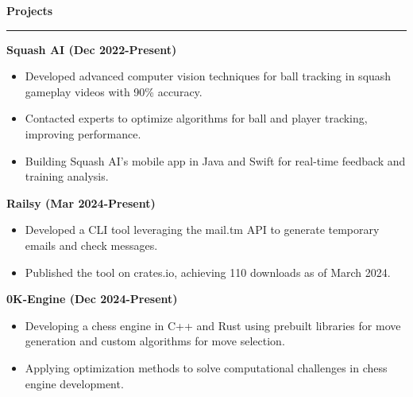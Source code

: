 \documentclass[11pt]{article}
\begin{document}
\vspace{-0.75em}
\noindent
\textbf{Projects} \\
\rule{\textwidth}{0.5pt}

\textbf{Squash AI (Dec 2022-Present)}
\begin{itemize}
    \item Developed advanced computer vision techniques for ball tracking in squash gameplay videos with 90\% accuracy.
    \item Contacted experts to optimize algorithms for ball and player tracking, improving performance.
    \item Building Squash AI’s mobile app in Java and Swift for real-time feedback and training analysis.
\end{itemize}

\textbf{Railsy (Mar 2024-Present)}
\begin{itemize}
    \item Developed a CLI tool leveraging the mail.tm API to generate temporary emails and check messages.
    \item Published the tool on crates.io, achieving 110 downloads as of March 2024.
\end{itemize}

\textbf{0K-Engine (Dec 2024-Present)}
\begin{itemize}
    \item Developing a chess engine in C++ and Rust using prebuilt libraries for move generation and custom algorithms for move selection.
    \item Applying optimization methods to solve computational challenges in chess engine development.
\end{itemize}
\end{document}
